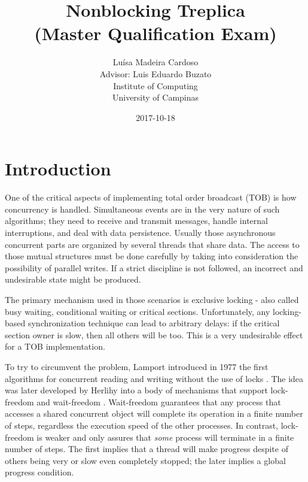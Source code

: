 \documentclass[12pt]{article}
\title{
    Nonblocking Treplica\\
    (Master Qualification Exam)}
\date{2017-10-18}
\author{
    Luísa Madeira Cardoso\\
    Advisor: Luis Eduardo Buzato\\
    Institute of Computing\\
    University of Campinas}
\begin{document}

\begin{titlingpage}
\maketitle
\end{titlingpage}

\newpage
{}
\setcounter{page}{2}

\abstract{

}


\section{Introduction}
One of the critical aspects of implementing total order broadcast (TOB) is how
concurrency is handled. Simultaneous events are in the very nature of such
algorithms; they need to receive and transmit messages, handle internal
interruptions, and deal with data persistence. Usually those asynchronous
concurrent parts are organized by several threads that share data. The access to
those mutual structures must be done carefully by taking into consideration the
possibility of parallel writes. If a strict discipline is not followed, an
incorrect and undesirable state might be produced.

The primary mechanism used in those scenarios is exclusive locking - also called
busy waiting, conditional waiting or critical sections. Unfortunately, any
locking-based synchronization technique can lead  to arbitrary delays: if the
critical section owner is slow, then all others will be too. This is a very
undesirable effect for a TOB implementation.

To try to circumvent the problem, Lamport introduced in 1977 the first algorithms
for concurrent reading and writing without the use of locks \cite{lamport77b}.
The idea was later developed by Herlihy into a body of mechanisms that support
lock-freedom and wait-freedom \cite{herlihy1990methodology}. Wait-freedom
guarantees that any process that accesses a shared concurrent  object will
complete its operation in a finite number of steps, regardless  the execution
speed of the other processes. In contrast, lock-freedom is weaker and only
assures that \textit{some} process will terminate in a finite number of steps.
The first implies that a thread will make progress despite of others being very
or slow even completely stopped; the later implies a global progress condition.
\end{document}
